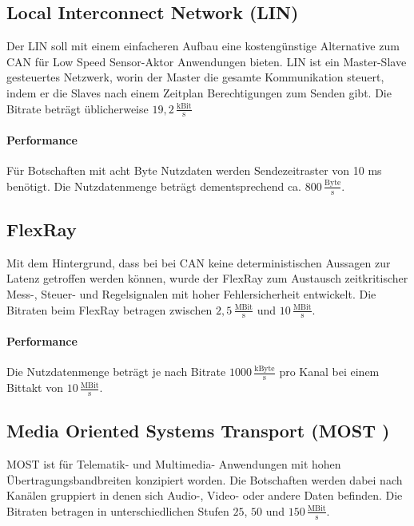 \subsection{Local Interconnect Network (LIN)} 
Der LIN soll mit einem einfacheren Aufbau eine kostengünstige Alternative zum CAN für Low Speed Sensor-Aktor Anwendungen bieten.
LIN ist ein Master-Slave gesteuertes Netzwerk, worin der Master die gesamte Kommunikation steuert, indem er die Slaves nach einem Zeitplan Berechtigungen zum Senden gibt. Die Bitrate beträgt üblicherweise $ 19,2\,\frac{\mathrm{kBit}}{\mathrm{s}} $
\cite[Vgl. Seite 79 ff.]{Zimmermann.2014}
\paragraph{Performance}
Für Botschaften mit acht Byte Nutzdaten werden Sendezeitraster von 10 ms benötigt. \cite[Vgl. Seite 94 f.]{Zimmermann.2014} Die Nutzdatenmenge beträgt dementsprechend ca. $ 800\,\frac{\mathrm{Byte}}{\mathrm{s}} $.
\subsection{FlexRay}
Mit dem Hintergrund, dass bei bei CAN keine deterministischen Aussagen zur Latenz getroffen werden können, wurde der FlexRay zum Austausch zeitkritischer Mess-, Steuer- und Regelsignalen mit hoher Fehlersicherheit entwickelt. Die Bitraten beim FlexRay betragen zwischen $ 2,5\,\frac{\mathrm{MBit}}{\mathrm{s}} $ und $ 10\,\frac{\mathrm{MBit}}{\mathrm{s}} $.
\cite[Vgl. Seite 96 ff.]{Zimmermann.2014}
\paragraph{Performance}
Die Nutzdatenmenge beträgt je nach Bitrate $ 1000\,\frac{\mathrm{kByte}}{\mathrm{s}} $ pro Kanal bei einem Bittakt von $ 10\,\frac{\mathrm{MBit}}{\mathrm{s}} $. 
\cite[Vgl. Seite 118 f.]{Zimmermann.2014}
\subsection{Media Oriented Systems Transport (MOST )}
MOST ist für Telematik- und Multimedia- Anwendungen mit hohen Übertragungsbandbreiten konzipiert worden.
Die Botschaften werden dabei nach Kanälen gruppiert in denen sich Audio-, Video- oder andere Daten befinden.
Die Bitraten betragen in unterschiedlichen Stufen $ 25 $, $ 50 $ und $ 150\,\frac{\mathrm{MBit}}{\mathrm{s}} $.

